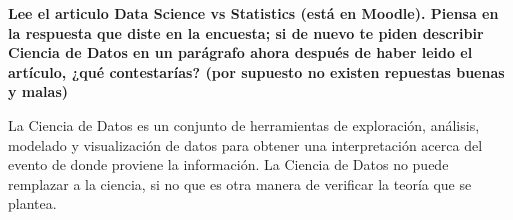 \item \textbf{Lee el articulo Data Science vs Statistics (está en Moodle). Piensa en la respuesta que diste en la encuesta; si de nuevo te piden describir Ciencia de Datos en un parágrafo ahora después de haber leido el artículo, ¿qué contestarías? (por supuesto no existen repuestas buenas y malas)}

La Ciencia de Datos es un conjunto de herramientas de exploración, análisis, modelado y visualización de datos para obtener una interpretación acerca del evento de donde proviene la información. La Ciencia de Datos no puede remplazar a la ciencia, si no que es otra manera de verificar la teoría que se plantea.